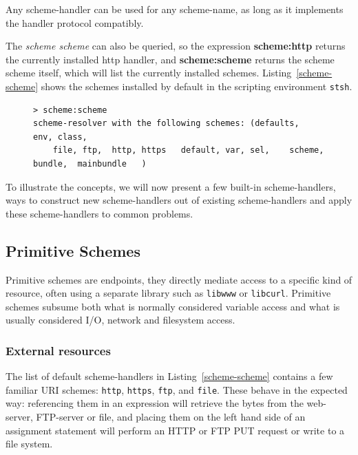 \documentclass{acm_proc_article-sp}
\begin{document}
\fussy

 Any scheme-handler
can be used for any scheme-name, as long as it implements the handler protocol
compatibly.


The \emph{scheme scheme} can also be queried,
so the expression {\bf scheme:http} returns the currently installed http handler, and 
{\bf scheme:scheme} returns the scheme scheme itself, which will list the currently
installed schemes.  Listing~\ref{scheme-scheme} shows the schemes installed by
default in the scripting environment {\tt stsh}.

\vspace{-0.5em}
\begin{figure}[htbp]
\begin{lstlisting}[style=numbers,label=scheme-scheme,caption=List of schemes via scheme:scheme.]
> scheme:scheme 
scheme-resolver with the following schemes: (defaults,  env, class,
    file, ftp,  http, https   default, var, sel,    scheme,    bundle,  mainbundle   )
\end{lstlisting}
\end{figure}
\vspace{-0.5em}

To illustrate the concepts, we will now present a few built-in scheme-handlers, ways to construct new
scheme-handlers out of existing scheme-handlers and apply these scheme-handlers to common
problems.

\subsection{Primitive Schemes}
\label{primitiveSchemes}

Primitive schemes are endpoints, they directly
mediate access to a specific kind of resource, often using a separate
library such as {\tt libwww} or {\tt libcurl}.  Primitive schemes
subsume both what is normally considered variable access and 
what is usually considered I/O, network and filesystem access.


\subsubsection{External resources}
\label{externalResources}

The list of default scheme-handlers in Listing~\ref{scheme-scheme} contains a few familiar URI schemes:
{\tt http}, {\tt https}, {\tt ftp}, and {\tt file}.   These behave in the expected way:   referencing them in an expression will
retrieve the bytes from the web-server, FTP-server or file, and placing them on the left hand side of
an assignment statement will perform an HTTP or FTP PUT request or write to a file system. 
 
\end{document}
